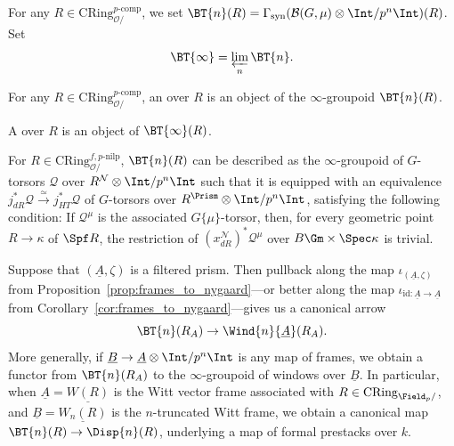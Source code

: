 \documentclass[10pt]{amsart}
\begin{document}
\begin{definition}
For any $R\in \mathrm{CRing}^{p\text{-comp}}_{\mathcal{O}/}$, we set $\BT{n}(R) = \Gamma_{\mathrm{syn}}(\mathcal{B}(G,\mu)\otimes\Int/p^n\Int)(R)$. Set 
\[
\BT{\infty} = \varprojlim_n\BT{n}.
\]

For any $R\in \mathrm{CRing}^{p\text{-comp}}_{\mathcal{O}/}$, an  over $R$ is an object of the $\infty$-groupoid $\BT{n}(R)$.


A  over $R$ is an object of $\BT{\infty}(R)$.
\end{definition}


\begin{remark}
\label{rem:pointwise}
For $R\in \mathrm{CRing}_{\mathcal{O}/}^{f,p\text{-nilp}}$, $\BT{n}(R)$ can be described as the $\infty$-groupoid of $G$-torsors $\mathcal{Q}$ over $R^{\mathcal{N}}\otimes\Int/p^n\Int$ such that it is equipped with an equivalence $j_{dR}^*\mathcal{Q}\xrightarrow{\simeq}j_{HT}^*\mathcal{Q}$ of $G$-torsors over $R^\Prism\otimes\Int/p^n\Int$, satisfying the following condition: If $\mathcal{Q}^\mu$ is the associated $G\{\mu\}$-torsor, then, for every geometric point $R\to \kappa$ of $\Spf R$, the restriction of $(x^{\mathcal{N}}_{dR})^*\mathcal{Q}^\mu$ over $B\Gm\times \Spec \kappa$ is trivial.
\end{remark}

\begin{remark}
\label{rem:pullback_to_frames}
Suppose that $(\underline{A},\zeta)$ is a filtered prism. Then pullback along the map $\iota_{(\underline{A},\zeta)}$ from Proposition~\ref{prop:frames_to_nygaard}---or better along the map $\iota_{\mathrm{id}:\underline{A}\to \underline{A}}$ from Corollary~\ref{cor:frames_to_nygaard}---gives us a canonical arrow
\[
\BT{n}(R_A)\to \Wind{n}{\underline{A}}(R_A).
\]
More generally, if $\underline{B}\to \underline{A}\otimes\Int/p^n\Int$ is any map of frames, we obtain a functor from $\BT{n}(R_A)$ to the $\infty$-groupoid of windows over $\underline{B}$. In particular, when $\underline{A} = \underline{W(R)}$ is the Witt vector frame associated with $R\in \mathrm{CRing}_{\Field_p/}$, and $\underline{B} = \underline{W_n(R)}$ is the $n$-truncated Witt frame, we obtain a canonical map $\BT{n}(R)\to \Disp{n}(R)$, underlying a map of formal prestacks over $k$.
\end{remark}
\end{document}
